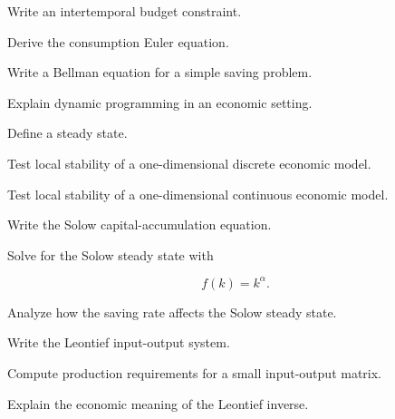 \begin{exercise}[2]
Write an intertemporal budget constraint.
\end{exercise}

\begin{exercise}[3]
Derive the consumption Euler equation.
\end{exercise}

\begin{exercise}[2]
Write a Bellman equation for a simple saving problem.
\end{exercise}

\begin{exercise}[3]
Explain dynamic programming in an economic setting.
\end{exercise}

\begin{exercise}[2]
Define a steady state.
\end{exercise}

\begin{exercise}[3]
Test local stability of a one-dimensional discrete economic model.
\end{exercise}

\begin{exercise}[3]
Test local stability of a one-dimensional continuous economic model.
\end{exercise}

\begin{exercise}[2]
Write the Solow capital-accumulation equation.
\end{exercise}

\begin{exercise}[3]
Solve for the Solow steady state with

\[
f(k)=k^\alpha.
\]
\end{exercise}

\begin{exercise}[3]
Analyze how the saving rate affects the Solow steady state.
\end{exercise}

\begin{exercise}[2]
Write the Leontief input-output system.
\end{exercise}

\begin{exercise}[3]
Compute production requirements for a small input-output matrix.
\end{exercise}

\begin{exercise}[3]
Explain the economic meaning of the Leontief inverse.
\end{exercise}

